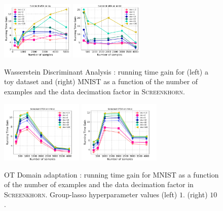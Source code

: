 \begin{figure}[t]
	\centering

	\includegraphics[width=0.31\textwidth]{./figs/wda_gain_toy.pdf}\hspace{1.5cm}
	\includegraphics[width=0.31\textwidth]{./figs/wda_gain_mnist.pdf}

	\caption{Wasserstein Discriminant Analysis : running time gain for (left) a toy dataset and (right) MNIST as a function of the number of examples and the data decimation factor in \textsc{Screenkhorn}.}
	\label{fig:wda}
\end{figure}
\begin{figure}[t]
	\centering

	\includegraphics[width=0.35\textwidth]{./figs/da_gain_mnist_regcl1.pdf}\hspace{1cm}
	\includegraphics[width=0.35\textwidth]{./figs/da_gain_mnist_regcl10.pdf}
	\caption{OT Domain adaptation : running time gain  for MNIST as a function of the number of examples and the data decimation factor in \textsc{Screenkhorn}. Group-lasso hyperparameter values (left) $1$. (right) $10$.}
	\label{fig:otda}
\end{figure}

